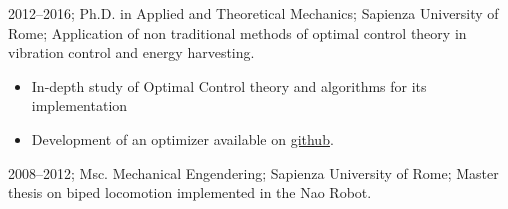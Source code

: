 \addstudy%
{%
    2012--2016;%
    Ph.D. in Applied and Theoretical Mechanics;%
    Sapienza University of Rome;%
    Application of non traditional methods of optimal control theory in vibration control and energy harvesting.%
    \begin{itemize}
        \item In-depth study of Optimal Control theory and algorithms for its implementation
        \item Development of an optimizer available on \href{https://github.com/rafaelrojasmiliani/krotov_ch6}{github}.
    \end{itemize}
}%

\addstudy%
{%
    2008--2012;%
    Msc. Mechanical Engendering;%
    Sapienza University of Rome;%
    Master thesis on biped locomotion implemented in the Nao Robot.%
}%
